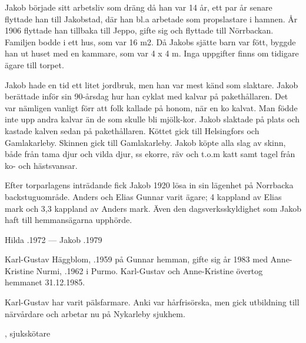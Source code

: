 Jakob började sitt arbetsliv som dräng då han var 14 år, ett par år senare flyttade han till Jakobstad, där han bl.a arbetade som propslastare i hamnen. År 1906 flyttade han tillbaka till Jeppo, gifte sig och flyttade till Nörrbackan. Familjen bodde i ett hus, som var 16 m2. Då Jakobs sjätte barn var fött, byggde han ut huset med en kammare, som var 4 x 4 m. Inga uppgifter finns om tidigare ägare till torpet.

Jakob hade en tid ett litet jordbruk, men han var mest känd som slaktare. Jakob berättade inför sin 90-årsdag hur han cyklat med kalvar på pakethållaren. Det var nämligen vanligt förr att folk kallade på honom, när en ko kalvat. Man födde inte upp andra kalvar än de som skulle bli mjölk-kor. Jakob slaktade på plats och kastade kalven sedan på pakethållaren. Köttet gick till Helsingfors och Gamlakarleby. Skinnen gick till Gamlakarleby. Jakob köpte alla slag av skinn, både från tama djur och vilda djur, ss ekorre, räv och t.o.m katt samt tagel från ko- och hästsvansar.

Efter torparlagens inträdande fick Jakob 1920 lösa in sin lägenhet på Norrbacka backstuguområde. Anders och Elias Gunnar varit ägare; 4 kappland av Elias mark och 3,3 kappland av Anders mark. Även den dagsverksskyldighet som Jakob haft till hemmansägarna upphörde.

Hilda .1972  ---  Jakob .1979



%



%
Karl-Gustav Häggblom, .1959 på Gunnar hemman, gifte sig år 1983 med Anne-Kristine Nurmi, .1962 i Purmo. Karl-Gustav och Anne-Kristine övertog hemmanet 31.12.1985.

Karl-Gustav har varit pälsfarmare. Anki var hårfrisörska, men gick utbildning till närvårdare och arbetar nu på Nykarleby sjukhem.
\begin{jhchildren}
  \item {}
  \item {}, sjukskötare
\end{jhchildren}


